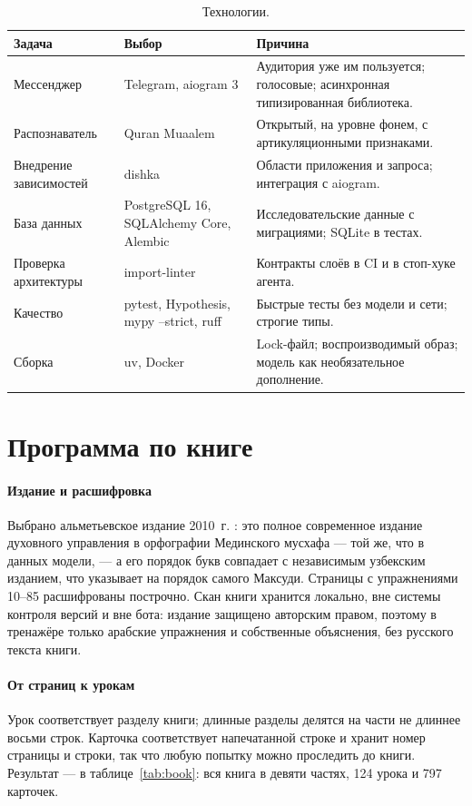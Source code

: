 \begin{table}[ht]
\centering\small
\caption{Технологии.}
\label{tab:stack}
\begin{tabularx}{\linewidth}{@{}P{3.2cm}P{4.2cm}L@{}}
\toprule
Задача & Выбор & Причина \\
\midrule
Мессенджер & Telegram, aiogram 3 & Аудитория уже им пользуется; голосовые; асинхронная типизированная
библиотека. \\
Распознаватель & Quran Muaalem \cite{SRC-003} & Открытый, на уровне фонем, с артикуляционными
признаками. \\
Внедрение зависимостей & dishka \cite{SRC-008} & Области приложения и запроса; интеграция с aiogram. \\
База данных & PostgreSQL 16, SQLAlchemy Core, Alembic & Исследовательские данные с миграциями; SQLite в
тестах. \\
Проверка архитектуры & import-linter \cite{SRC-009} & Контракты слоёв в CI и в стоп-хуке агента. \\
Качество & pytest, Hypothesis, mypy --strict, ruff & Быстрые тесты без модели и сети; строгие типы. \\
Сборка & uv, Docker & Lock-файл; воспроизводимый образ; модель как необязательное дополнение. \\
\bottomrule
\end{tabularx}
\end{table}

\section{Программа по книге}\label{sec:impl-curriculum}

\paragraph{Издание и расшифровка} Выбрано альметьевское издание 2010~г. \cite{SRC-040}: это полное
современное издание духовного управления в орфографии Мединского мусхафа --- той же, что в данных модели,
--- а его порядок букв совпадает с независимым узбекским изданием, что указывает на порядок самого Максуди.
Страницы с упражнениями 10--85 расшифрованы построчно. Скан книги хранится локально, вне системы контроля
версий и вне бота: издание защищено авторским правом, поэтому в тренажёре только арабские упражнения и
собственные объяснения, без русского текста книги.

\paragraph{От страниц к урокам} Урок соответствует разделу книги; длинные разделы делятся на части не
длиннее восьми строк. Карточка соответствует напечатанной строке и хранит номер страницы и строки, так что
любую попытку можно проследить до книги. Результат --- в таблице~\ref{tab:book}: вся книга в девяти
частях, 124 урока и 797 карточек.

